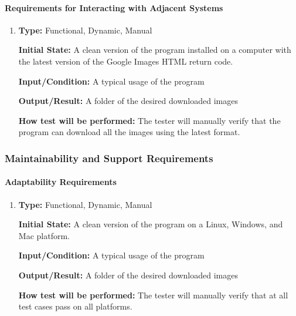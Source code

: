 \documentclass[12pt, titlepage]{article}
\begin{document}
\paragraph{Requirements for Interacting with Adjacent Systems}

\begin{enumerate}[label=NFR-IAR\arabic*:, wide=0pt, leftmargin=*]

\item \phantom{empty}

\textbf{Type:} Functional, Dynamic, Manual
					
\textbf{Initial State:} A clean version of the program installed on a computer with the latest version of the Google Images HTML return code.
					
\textbf{Input/Condition:} A typical usage of the program
					
\textbf{Output/Result:} A folder of the desired downloaded images
					
\textbf{How test will be performed:} The tester will manually verify that the program can download all the images using the latest format.

\end{enumerate}

\subsubsection{Maintainability and Support Requirements}
		
\paragraph{Adaptability Requirements}

\begin{enumerate}[label=NFR-ADR\arabic*:, wide=0pt, leftmargin=*]

\item \phantom{empty}

\textbf{Type:} Functional, Dynamic, Manual
					
\textbf{Initial State:} A clean version of the program on a Linux, Windows, and Mac platform.
					
\textbf{Input/Condition:} A typical usage of the program
					
\textbf{Output/Result:} A folder of the desired downloaded images
					
\textbf{How test will be performed:} The tester will manually verify that at all test cases pass on all platforms.

\end{enumerate}
\end{document}
